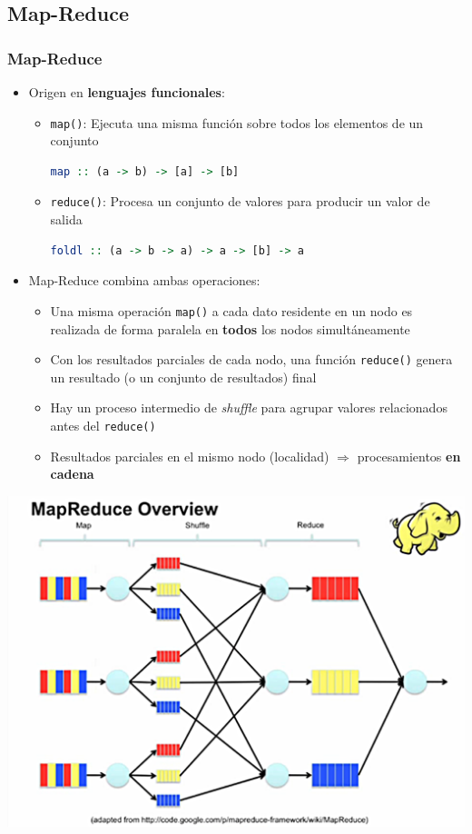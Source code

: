 \documentclass[14pt]{beamer}
\begin{document}
\subsection{Map-Reduce}

\begin{frame}
\frametitle{Map-Reduce}
\begin{itemize}
\item Origen en {\bf lenguajes funcionales}:
\begin{itemize}
\item {\tt map()}: Ejecuta una misma función sobre todos los elementos de
  un conjunto
\begin{lstlisting}[language=haskell]
map :: (a -> b) -> [a] -> [b]
\end{lstlisting}
\item {\tt reduce()}: Procesa un conjunto de valores para producir un
  valor de salida
\begin{lstlisting}[language=haskell]
foldl :: (a -> b -> a) -> a -> [b] -> a
\end{lstlisting}
\end{itemize}

\framebreak

\item Map-Reduce combina ambas operaciones:
\begin{itemize}
\item Una misma operación {\tt map()} a cada dato residente en un nodo es
  realizada de forma paralela en {\bf todos} los nodos simultáneamente
\item Con los resultados parciales de cada nodo, una función {\tt reduce()}
  genera un resultado (o un conjunto de resultados) final
\item Hay un proceso intermedio de {\em shuffle} para agrupar valores
  relacionados antes del {\tt reduce()}
\item Resultados parciales en el mismo nodo (localidad) $\Rightarrow$
  procesamientos {\bf en cadena}
\end{itemize}
\end{itemize}

\framebreak

\centering\includegraphics[width=.9\textwidth]{img/mapreduce1}


\end{frame}
\end{document}
